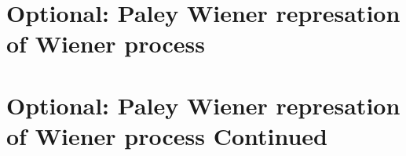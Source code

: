 \documentclass{article}
\begin{document}
\section{Optional: Paley Wiener represation of Wiener process}

\section{Optional: Paley Wiener represation of Wiener process Continued}
\end{document}
